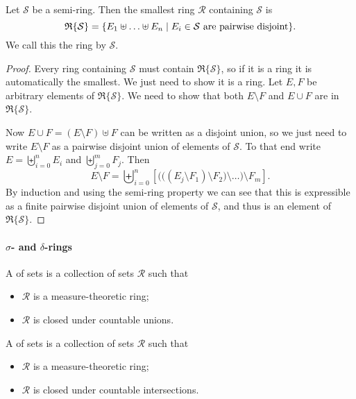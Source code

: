 \begin{lemma} \label{ringFromSemiRing}
Let $\mathcal{S}$ be a semi-ring. Then the smallest ring $\mathcal{R}$ containing $\mathcal{S}$ is
\[ \mathfrak{R}\{\mathcal{S}\} = \setbuilder{E_1\uplus\ldots\uplus E_n}{\text{$E_i\in \mathcal{S}$ are pairwise disjoint}}. \]
We call this the ring  by $\mathcal{S}$.
\end{lemma}
\begin{proof}
Every ring containing $\mathcal{S}$ must contain $\mathfrak{R}\{\mathcal{S}\}$, so if it is a ring it is automatically the smallest. We just need to show it is a ring. Let $E,F$ be arbitrary elements of $\mathfrak{R}\{\mathcal{S}\}$. We need to show that both $E\setminus F$ and $E\cup F$ are in $\mathfrak{R}\{\mathcal{S}\}$.

Now $E\cup F = (E\setminus F) \uplus F$ can be written as a disjoint union, so we just need to write $E\setminus F$ as a pairwise disjoint union of elements of $\mathcal{S}$. To that end write $E = \biguplus_{i=0}^nE_i$ and $\biguplus_{j= 0}^mF_j$. Then
\[ E\setminus F = \biguplus_{i=0}^n \left[ \Big(\big((E_j\setminus F_1)\setminus F_2\big)\setminus \ldots\Big)\setminus F_m \right]. \]
By induction and using the semi-ring property we can see that this is expressible as a finite pairwise disjoint union of elements of $\mathcal{S}$, and thus is an element of $\mathfrak{R}\{\mathcal{S}\}$.
\end{proof}

\paragraph{$\sigma$- and $\delta$-rings}
\begin{definition}
A  of sets is a collection of sets $\mathcal{R}$ such that
\begin{itemize}
\item $\mathcal{R}$ is a measure-theoretic ring;
\item $\mathcal{R}$ is closed under countable unions.
\end{itemize}
A  of sets is a collection of sets $\mathcal{R}$ such that
\begin{itemize}
\item $\mathcal{R}$ is a measure-theoretic ring;
\item $\mathcal{R}$ is closed under countable intersections.
\end{itemize}
\end{definition}

